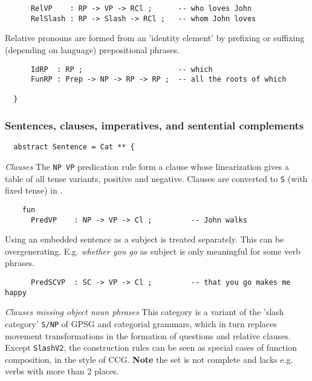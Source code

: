 \documentclass[11pt,a4paper]{article}
\newcommand{\commOut}[1]{}
\newcommand{\subsubsubsection}[1]{\textit{#1}}
\begin{document}
\begin{verbatim}
      RelVP    : RP -> VP -> RCl ;      -- who loves John
      RelSlash : RP -> Slash -> RCl ;   -- whom John loves
\end{verbatim}

Relative pronouns are formed from an 'identity element' by prefixing
or suffixing (depending on language) prepositional phrases.

\begin{verbatim}
      IdRP  : RP ;                      -- which
      FunRP : Prep -> NP -> RP -> RP ;  -- all the roots of which 
  
  }
\end{verbatim}

\commOut{Produced by 
gfdoc - a rudimentary GF document generator.
(c) Aarne Ranta (\htmladdnormallink{aarne@cs.chalmers.se}{mailto:aarne@cs.chalmers.se}) 2002 under GNU GPL.}


\subsubsection{Sentences, clauses, imperatives, and sentential complements}
\begin{verbatim}
  abstract Sentence = Cat ** {
\end{verbatim}

\subsubsubsection{Clauses}
The \texttt{NP VP} predication rule form a clause whose linearization
gives a table of all tense variants, positive and negative.
Clauses are converted to \texttt{S} (with fixed tense) in .

\begin{verbatim}
    fun
      PredVP    : NP -> VP -> Cl ;         -- John walks
\end{verbatim}

Using an embedded sentence as a subject is treated separately.
This can be overgenerating. E.g. \textit{whether you go} as subject
is only meaningful for some verb phrases.

\begin{verbatim}
      PredSCVP  : SC -> VP -> Cl ;         -- that you go makes me happy
\end{verbatim}

\subsubsubsection{Clauses missing object noun phrases}
This category is a variant of the 'slash category' \texttt{S/NP} of
GPSG and categorial grammars, which in turn replaces
movement transformations in the formation of questions
and relative clauses. Except \texttt{SlashV2}, the construction 
rules can be seen as special cases of function composition, in
the style of CCG.
\textbf{Note} the set is not complete and lacks e.g. verbs with more than 2 places.
\end{document}
